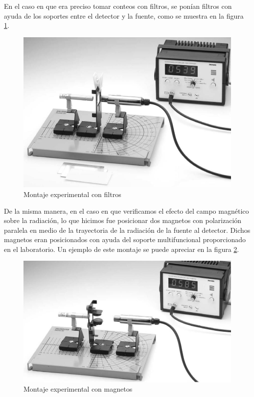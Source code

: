 \documentclass[%
 reprint,
 amsmath,amssymb,
 aps,
]{revtex4-1}
\begin{document}
En el caso en que era preciso tomar conteos con filtros, se ponían filtros con ayuda de los soportes entre el detector y la fuente, como se muestra en la figura \ref{fig:montaje-filtros}. \\

\begin{figure}[h!]
\centering
\includegraphics[width=1\linewidth]{montaje2.jpg}
\caption{Montaje experimental con filtros}
\label{fig:montaje-filtros}
\end{figure}

De la misma manera, en el caso en que verificamos el efecto del campo magnético sobre la radiación, lo que hicimos fue posicionar dos magnetos con polarización paralela en medio de la trayectoria de la radiación de la fuente al detector. Dichos magnetos eran posicionados con ayuda del soporte multifuncional proporcionado en el laboratorio. Un ejemplo de este montaje se puede apreciar en la figura \ref{fig:magnetico}.\\


\begin{figure}[h!]
\centering
\includegraphics[width=1\linewidth]{magnetos2.jpg}
\caption{Montaje experimental con magnetos}
\label{fig:magnetico}
\end{figure}
\end{document}
